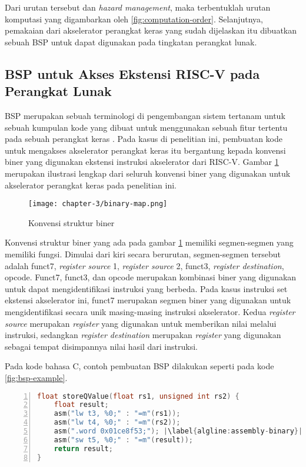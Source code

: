Dari urutan tersebut dan \textit{hazard management}, maka terbentuklah urutan komputasi yang digambarkan oleh \ref{fig:computation-order}. Selanjutnya, pemakaian dari akselerator perangkat keras yang sudah dijelaskan itu dibuatkan sebuah \ac{BSP} untuk dapat digunakan pada tingkatan perangkat lunak.

\subsection{\acl{BSP} untuk Akses Ekstensi RISC-V pada Perangkat Lunak}

\acf{BSP} merupakan sebuah terminologi di pengembangan sistem tertanam untuk sebuah kumpulan kode yang dibuat untuk menggunakan sebuah fitur tertentu pada sebuah perangkat keras \parencite{xin2021firmware}. Pada kasus di penelitian ini, pembuatan kode untuk mengakses akselerator perangkat keras itu bergantung kepada konvensi biner yang digunakan ekstensi instruksi akselerator dari RISC-V. Gambar \ref{fig:binary-map} merupakan ilustrasi lengkap dari seluruh konvensi biner yang digunakan untuk akselerator perangkat keras pada penelitian ini.

\begin{figure}[H]
	\centering
	\texttt{[image: chapter-3/binary-map.png]}
	\caption{Konvensi struktur biner}
	\label{fig:binary-map}
\end{figure}

Konvensi struktur biner yang ada pada gambar \ref{fig:binary-map} memiliki segmen-segmen yang memiliki fungsi. Dimulai dari kiri secara berurutan, segmen-segmen tersebut adalah funct7, \textit{register source} 1, \textit{register source} 2, funct3, \textit{register destination}, opcode. Funct7, funct3, dan opcode merupakan kombinasi biner yang digunakan untuk dapat mengidentifikasi instruksi yang berbeda. Pada kasus instruksi set ekstensi akselerator ini, funct7 merupakan segmen biner yang digunakan untuk mengidentifikasi secara unik masing-masing instruksi akselerator. Kedua \textit{register source} merupakan \textit{register} yang digunakan untuk memberikan nilai melalui instruksi, sedangkan \textit{register destination} merupakan \textit{register} yang digunakan sebagai tempat disimpannya nilai hasil dari instruksi.

Pada kode bahasa C, contoh pembuatan \ac{BSP} dilakukan seperti pada kode \ref{fig:bsp-example}.

\begin{lstlisting}[caption={Contoh fungsi \ac{BSP}},label={fig:bsp-example},language=C,escapechar=|,numbers=left,captionpos=b]
float storeQValue(float rs1, unsigned int rs2) {
	float result;
	asm("lw t3, %0;" : "=m"(rs1));
	asm("lw t4, %0;" : "=m"(rs2));
	asm(".word 0x01ce8f53;"); |\label{algline:assembly-binary}|
	asm("sw t5, %0;" : "=m"(result)); 
	return result;
}
\end{lstlisting}

